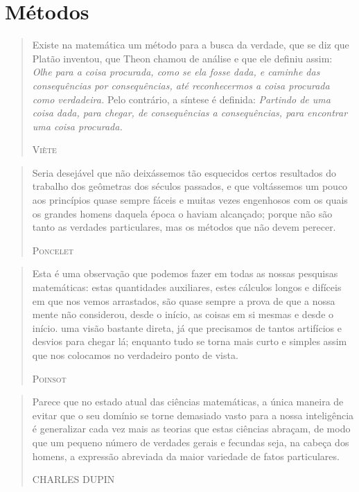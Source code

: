 \documentclass{hipatia}
\begin{document}
 

\section{Métodos}


\begin{quote}
Existe na matemática um método para a busca da verdade, que se diz que Platão inventou, que Theon chamou de análise e que ele definiu assim: \emph{Olhe para a coisa procurada, como se ela fosse dada, e caminhe das consequências por consequências, até reconhecermos a coisa procurada como verdadeira.} Pelo contrário, a síntese é definida: \emph{Partindo de uma coisa dada, para chegar, de consequências a consequências, para encontrar uma coisa procurada.}

\hfill \textsc{Viète}
\end{quote}

 
 
\begin{quote}
Seria desejável que não deixássemos tão esquecidos certos resultados do trabalho dos geômetras dos séculos passados, e que voltássemos um pouco aos princípios quase sempre fáceis e muitas vezes engenhosos com os quais os grandes homens daquela época o haviam alcançado; porque não são tanto as verdades particulares, mas os métodos que não devem perecer.

\hfill \textsc{Poncelet}
\end{quote}
 


\begin{quote}
Esta é uma observação que podemos fazer em todas as nossas pesquisas matemáticas: estas quantidades auxiliares, estes cálculos longos e difíceis em que nos vemos arrastados, são quase sempre a prova de que a nossa mente não considerou, desde o início, as coisas em si mesmas e desde o início. uma visão bastante direta, já que precisamos de tantos artifícios e desvios para chegar lá; enquanto tudo se torna mais curto e simples assim que nos colocamos no verdadeiro ponto de vista.

\hfill \textsc{Poinsot}
\end{quote}


 
\begin{quote}
Parece que no estado atual das ciências matemáticas, a única maneira de evitar que o seu domínio se torne demasiado vasto para a nossa inteligência é generalizar cada vez mais as teorias que estas ciências abraçam, de modo que um pequeno número de verdades gerais e fecundas seja, na cabeça dos homens, a expressão abreviada da maior variedade de fatos particulares.

\hfill \textsc{CHARLES DUPIN}
\end{quote}
 
\end{document}
